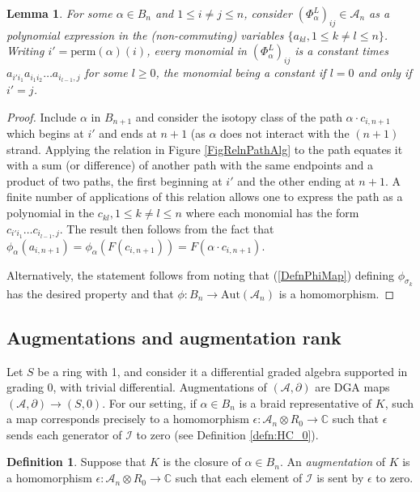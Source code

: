 \documentclass[11pt]{amsart}
\def\C{{\mathbb C}}
\def\A{{\mathcal A}}
\def\s{{\sigma}}
\newtheorem{lem}[thm]{Lemma}
\theoremstyle{definition}
\newtheorem{defn}[thm]{Definition}
\begin{document}
  \begin{lem} For some $\alpha\in B_n$ and $1\le i\ne j\le n$, consider $(\Phi_\alpha^L)_{ij}\in \A_n$ as a polynomial expression in the (non-commuting) variables $\{a_{kl}, 1\le k\ne l\le n\}$. Writing $i'=\text{perm}(\alpha)(i)$, every monomial in $(\Phi_\alpha^L)_{ij}$ is a constant times $a_{i'i_1}a_{i_1i_2}\ldots a_{i_{l-1},j}$ for some $l\ge 0$, the monomial being a constant if $l=0$ and only if $i'=j$.
  \label{lem:monomial}
  \end{lem}
  \begin{proof}Include $\alpha$ in $B_{n+1}$ and consider the isotopy class of the path $\alpha\cdot c_{i,n+1}$ which begins at $i'$ and ends at $n+1$ (as $\alpha$ does not interact with the $(n+1)$ strand. Applying the relation in Figure \ref{FigRelnPathAlg} to the path equates it with a sum (or difference) of another path with the same endpoints and a product of two paths, the first beginning at $i'$ and the other ending at $n+1$. A finite number of applications of this relation allows one to express the path as a polynomial in the $c_{kl}, 1\le k\ne l\le n$ where each monomial has the form $c_{i'i_1}\ldots c_{i_{l-1},j}$. The result then follows from the fact that $\phi_\alpha(a_{i,n+1}) = \phi_\alpha(F(c_{i,n+1})) = F(\alpha\cdot c_{i,n+1})$.

  Alternatively, the statement follows from noting that (\ref{DefnPhiMap}) defining $\phi_{\s_k}$ has the desired property and that $\phi:B_n\to\text{Aut}(\A_n)$ is a homomorphism.
  \end{proof}

\subsection{Augmentations and augmentation rank}
\label{SecBG_AugRk}

  Let $S$ be a ring with 1, and consider it a differential graded algebra supported in grading 0, with trivial differential. Augmentations of $(\A,\partial)$ are DGA maps $(\A,\partial)\to (S,0)$. For our setting, if $\alpha\in B_n$ is a braid representative of $K$, such a map corresponds precisely to a homomorphism $\epsilon:\A_n\otimes R_0\to\C$ such that $\epsilon$ sends each generator of $\mathcal I$ to zero (see Definition \ref{defn:HC_0}).

  \begin{defn}
  Suppose that $K$ is the closure of $\alpha\in B_n$. An \emph{augmentation} of $K$ is a homomorphism $\epsilon: \A_n\otimes R_0\rightarrow \C$ such that each element of $\mathcal I$ is sent by $\epsilon$ to zero.
  \label{defn:Aug}
  \end{defn}
\end{document}
